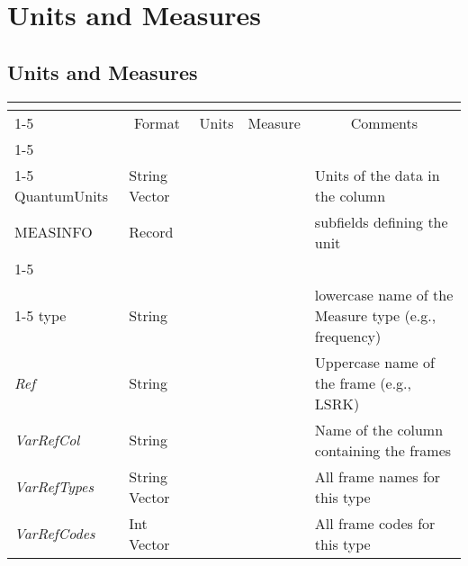 \documentclass{article}
\newcommand{\defline}[1]{\cline{1-5}
\multicolumn{5}{|l|}{#1} \\
\cline{1-5}}
\newcommand{\definetable}[3][]
{
  \vfill\newpage
  \subsection{#2}
  \label{tbl:#1}
  \vspace{0.15in}
  \small
  \begin{tabular}{|l|p{1.25in}|l|p{.9in}|p{1.4in}|}
  \hline
  \multicolumn{5}{|c|}{\bf #1}\\
  \cline{1-5}
  \multicolumn{1}{|c|}{Name}&\multicolumn{1}{|c|}{Format}&
  \multicolumn{1}{|c|}{Units}&\multicolumn{1}{|c|}{Measure}&
  \multicolumn{1}{|c|}{Comments}\\
  \cline{1-5}
  #3
  \hline
  \end{tabular}
}
\begin{document}
\section{Units and Measures}

\definetable{Units and Measures}{
\defline{\bf Column keywords}
QuantumUnits &        String Vector &    &      & Units of the data in the column\\
MEASINFO &  Record  &     &   & subfields defining the unit\\
\defline{\em Subfields of MEASINFO}
type &        String    &      &      & lowercase name of the Measure type (e.g., frequency)\\
{\it Ref} & String &     &      & Uppercase name of the frame (e.g., LSRK)\\
{\it VarRefCol} & String &     &      & Name of the column containing the frames\\
{\it VarRefTypes} & String Vector&     &      & All frame names for this type\\
{\it VarRefCodes} & Int Vector&     &      & All frame codes for this type\\
}
\end{document}
